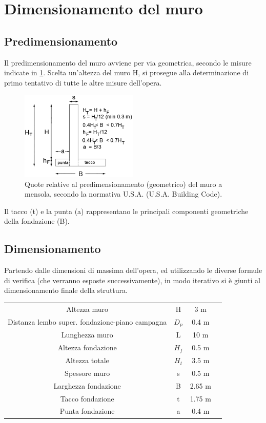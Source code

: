 \section{Dimensionamento del muro}
\subsection{Predimensionamento}
Il predimensionamento del muro avviene per via geometrica, secondo le misure indicate in \cref{figure:predimensionamento_muro}. Scelta un'altezza del muro H, si prosegue alla determinazione di primo tentativo di tutte le altre misure dell'opera.
\begin{figure}[H]
    \centering
    \includegraphics[width=0.5\textwidth]{immagini/predimensionamento_muro.pdf} \hfill
        \caption{Quote relative al predimensionamento (geometrico) del muro a mensola, secondo la normativa U.S.A. (U.S.A. Building Code).}
    \label{figure:predimensionamento_muro}
\end{figure}
Il tacco (t) e la punta (a) rappresentano le principali componenti geometriche della fondazione (B).

\subsection{Dimensionamento}
Partendo dalle dimensioni di massima dell'opera, ed utilizzando le diverse formule di verifica (che verranno esposte successivamente), in modo iterativo si è giunti al dimensionamento finale della struttura.

\begin{table}[H] \centering
\begin{tabular}{cccc}
    \toprule
Altezza muro & H & 3 m \\
Distanza lembo super. fondazione-piano campagna & $D_p$ & 0.4 \unit{m}  \\
Lunghezza muro & L & 10 \unit{m}  \\
Altezza fondazione & $H_f$ & 0.5 \unit{m}   \\
Altezza totale & $H_t$ & 3.5 \unit{m}   \\
Spessore muro & s & 0.5 \unit{m}  \\
Larghezza fondazione & B & 2.65 \unit{m}   \\
Tacco fondazione & t & 1.75 \unit{m}   \\
Punta fondazione & a & 0.4 \unit{m}   \\
\bottomrule
\end{tabular}
\end{table}


